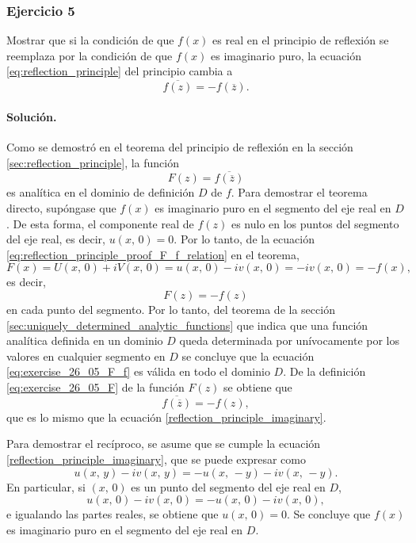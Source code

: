 \documentclass[a4paper]{report}
\begin{document}
\subsubsection{Ejercicio 5}

Mostrar que si la condición de que \(f(x)\) es real en el principio de reflexión se reemplaza por la condición de que \(f(x)\) es imaginario puro, la ecuación \ref{eq:reflection_principle} del principio cambia a 
\begin{equation}\label{reflection_principle_imaginary}
 \overline{f(z)}=-f(\overline{z}).
\end{equation}

\paragraph{Solución.} Como se demostró en el teorema del principio de reflexión en la sección \ref{sec:reflection_principle}, la función
\begin{equation}\label{eq:exercise_26_05_F}
 F(z)=\overline{f(\overline{z})}
\end{equation}
es analítica en el dominio de definición \(D\) de \(f\). Para demostrar el teorema directo, supóngase que \(f(x)\) es imaginario puro en el segmento del eje real en \(D\). De esta forma, el componente real de \(f(z)\) es nulo en los puntos del segmento del eje real, es decir, \(u(x,\,0)=0\). Por lo tanto, de la ecuación \ref{eq:reflection_principle_proof_F_f_relation} en el teorema,
\[
 F(x)=U(x,\,0)+iV(x,\,0)=u(x,\,0)-iv(x,\,0)=-iv(x,\,0)=-f(x),
\]
es decir,
\begin{equation}\label{eq:exercise_26_05_F_f}
 F(z)=-f(z)
\end{equation}
en cada punto del segmento. Por lo tanto, del teorema de la sección \ref{sec:uniquely_determined_analytic_functions} que indica que una función analítica definida en un dominio \(D\) queda determinada por unívocamente por los valores en cualquier segmento en \(D\) se concluye que la ecuación \ref{eq:exercise_26_05_F_f} es válida en todo el dominio \(D\). De la definición \ref{eq:exercise_26_05_F} de la función \(F(z)\) se obtiene que
\begin{equation}\label{reflection_principle_imaginary_alt}
 \overline{f(\overline{z})}=-f(z), 
\end{equation}
que es lo mismo que la ecuación \ref{reflection_principle_imaginary}.

Para demostrar el recíproco, se asume que se cumple la ecuación \ref{reflection_principle_imaginary}, que se puede expresar como
\[
 u(x,\,y)-iv(x,\,y)=-u(x,\,-y)-iv(x,\,-y).
\]
En particular, si \((x,\,0)\) es un punto del segmento del eje real en \(D\),
\[
 u(x,\,0)-iv(x,\,0)=-u(x,\,0)-iv(x,\,0),
\]
e igualando las partes reales, se obtiene que \(u(x,\,0)=0\). Se concluye que \(f(x)\) es imaginario puro en el segmento del eje real en \(D\).
\end{document}
